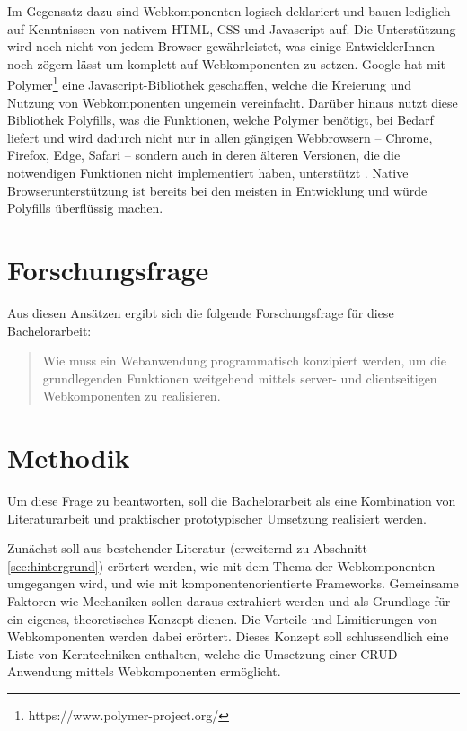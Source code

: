 Im Gegensatz dazu sind Webkomponenten logisch deklariert und bauen lediglich auf Kenntnissen von nativem HTML, CSS und Javascript auf. Die Unterstützung wird noch nicht von jedem Browser gewährleistet, was einige EntwicklerInnen noch zögern lässt um komplett auf Webkomponenten zu setzen.
Google hat mit Polymer\footnote{https://www.polymer-project.org/} eine Javascript-Bibliothek geschaffen, welche die Kreierung und Nutzung von Webkomponenten ungemein vereinfacht. Darüber hinaus nutzt diese Bibliothek Polyfills, was die Funktionen, welche Polymer benötigt, bei Bedarf liefert und wird dadurch nicht nur in allen gängigen Webbrowsern -- Chrome, Firefox, Edge, Safari --  sondern auch in deren älteren Versionen, die die notwendigen Funktionen nicht implementiert haben, unterstützt \cite{polymer-compatibility}. Native Browserunterstützung ist bereits bei den meisten in Entwicklung und würde Polyfills überflüssig machen.  
  
\section{Forschungsfrage}

Aus diesen Ansätzen ergibt sich die folgende Forschungsfrage für diese Bachelorarbeit:

\begin{quote}
Wie muss ein Webanwendung programmatisch konzipiert werden, um die grundlegenden Funktionen weitgehend mittels server- und clientseitigen Webkomponenten zu realisieren.
\end{quote}

\section{Methodik}

Um diese Frage zu beantworten, soll die Bachelorarbeit als eine Kombination von Literaturarbeit und praktischer \bzw prototypischer Umsetzung realisiert werden.

Zunächst soll aus bestehender Literatur (erweiternd zu Abschnitt \ref{sec:hintergrund}) erörtert werden, wie mit dem Thema der Webkomponenten umgegangen wird, und wie mit komponentenorientierte Frameworks. Gemeinsame Faktoren wie Mechaniken sollen daraus extrahiert werden und als Grundlage für ein eigenes, theoretisches Konzept dienen. Die Vorteile und Limitierungen von Webkomponenten werden dabei erörtert. Dieses Konzept soll schlussendlich eine Liste von Kerntechniken enthalten, welche die Umsetzung einer CRUD-Anwendung mittels Webkomponenten ermöglicht.

